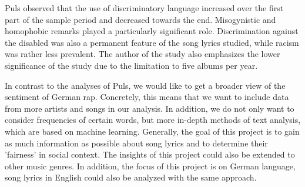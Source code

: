 Puls observed that the use of discriminatory language increased over the first part of the sample period and decreased towards the end. Misogynistic and homophobic remarks played a particularly significant role. Discrimination against the disabled was also a permanent feature of the song lyrics studied, while racism was rather less prevalent. The author of the study also emphasizes the lower significance of the study due to the limitation to five albums per year.

In contrast to the analyses of Puls, we would like to get a broader view of the sentiment of German rap. Concretely, this means that we want to include data from more artists and songs in our analysis. In addition, we do not only want to consider frequencies of certain words, but more in-depth methods of text analysis, which are based on machine learning. Generally, the goal of this project is to gain as much information as possible about song lyrics and to determine their 'fairness' in social context. The insights of this project could also be extended to other music genres. In addition, the focus of this project is on German language, song lyrics in English could also be analyzed with the same approach.

